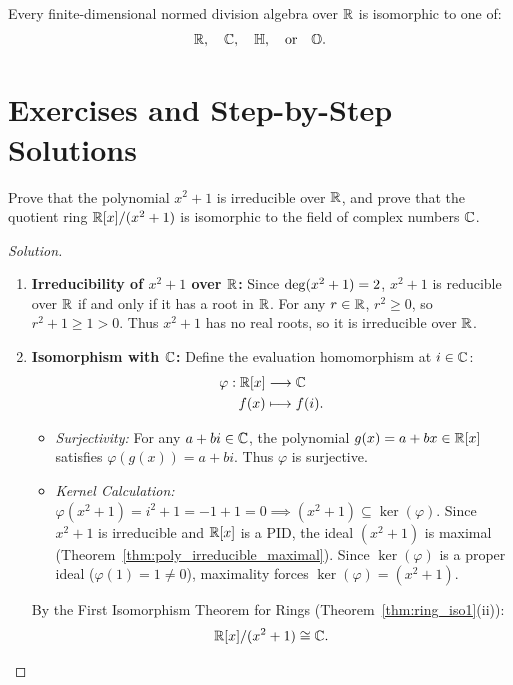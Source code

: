 \begin{theorem}
\label{thm:hurwitz}
Every finite-dimensional normed division algebra over $\mathbb{R}$ is isomorphic to one of:
\begin{equation}
\mathbb{R}, \quad \mathbb{C}, \quad \mathbb{H}, \quad \text{or} \quad \mathbb{O}.
\end{equation}
\end{theorem}

\section{Exercises and Step-by-Step Solutions}
\label{sec:unit5_exercises}

\begin{problem}
Prove that the polynomial $x^2 + 1$ is irreducible over $\mathbb{R}$, and prove that the quotient ring $\mathbb{R}[x]/(x^2 + 1)$ is isomorphic to the field of complex numbers $\mathbb{C}$.
\end{problem}

\begin{proof}[Solution]
\begin{enumerate}[label=\arabic*., leftmargin=*]
    \item \textbf{Irreducibility of $x^2 + 1$ over $\mathbb{R}$:}
    Since $\operatorname{deg}(x^2 + 1) = 2$, $x^2 + 1$ is reducible over $\mathbb{R}$ if and only if it has a root in $\mathbb{R}$.
    For any $r \in \mathbb{R}$, $r^2 \ge 0$, so $r^2 + 1 \ge 1 > 0$.
    Thus $x^2 + 1$ has no real roots, so it is irreducible over $\mathbb{R}$.

    \item \textbf{Isomorphism with $\mathbb{C}$:}
    Define the evaluation homomorphism at $i \in \mathbb{C}$:
    \begin{align*}
    \varphi: \mathbb{R}[x] &\longrightarrow \mathbb{C} \\
    f(x) &\longmapsto f(i).
    \end{align*}
    \begin{itemize}[leftmargin=1.5em, itemsep=3pt]
        \item \emph{Surjectivity:} For any $a + bi \in \mathbb{C}$, the polynomial $g(x) = a + bx \in \mathbb{R}[x]$ satisfies $\varphi(g(x)) = a + bi$. Thus $\varphi$ is surjective.
        \item \emph{Kernel Calculation:}
        $\varphi(x^2 + 1) = i^2 + 1 = -1 + 1 = 0 \implies (x^2 + 1) \subseteq \ker(\varphi)$.
        Since $x^2 + 1$ is irreducible and $\mathbb{R}[x]$ is a PID, the ideal $(x^2 + 1)$ is maximal (Theorem~\ref{thm:poly_irreducible_maximal}).
        Since $\ker(\varphi)$ is a proper ideal ($\varphi(1) = 1 \ne 0$), maximality forces $\ker(\varphi) = (x^2 + 1)$.
    \end{itemize}
    By the First Isomorphism Theorem for Rings (Theorem~\ref{thm:ring_iso1}(ii)):
    \begin{equation*}
    \mathbb{R}[x]/(x^2 + 1) \cong \mathbb{C}.
    \end{equation*}
\end{enumerate}
\end{proof}


